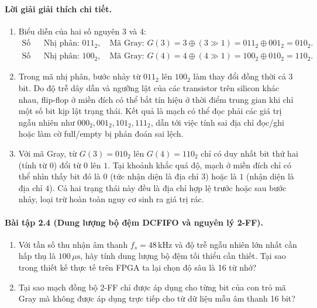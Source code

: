 \paragraph{Lời giải giải thích chi tiết.}
\begin{enumerate}[label=\alph*)]
    \item Biểu diễn của hai số nguyên 3 và 4:
    \begin{align*}
    \text{Số 3: } & \text{Nhị phân: } 011_2, \quad \text{Mã Gray: } G(3) = 3 \oplus (3 \gg 1) = 011_2 \oplus 001_2 = 010_2.\\
    \text{Số 4: } & \text{Nhị phân: } 100_2, \quad \text{Mã Gray: } G(4) = 4 \oplus (4 \gg 1) = 100_2 \oplus 010_2 = 110_2.
    \end{align*}
    \item Trong mã nhị phân, bước nhảy từ $011_2$ lên $100_2$ làm thay đổi đồng thời cả $3$ bit. Do độ trễ dây dẫn và ngưỡng lật của các transistor trên silicon khác nhau, flip-flop ở miền đích có thể bắt tín hiệu ở thời điểm trung gian khi chỉ một số bit kịp lật trạng thái. Kết quả là mạch có thể đọc phải các giá trị ngẫu nhiên như $000_2, 001_2, 101_2, 111_2$, dẫn tới việc tính sai địa chỉ đọc/ghi hoặc làm cờ full/empty bị phán đoán sai lệch.
    \item Với mã Gray, từ $G(3) = 010_2$ lên $G(4) = 110_2$ chỉ có duy nhất bit thứ hai (tính từ 0) đổi từ $0$ lên $1$. Tại khoảnh khắc quá độ, mạch ở miền đích chỉ có thể nhìn thấy bit đó là $0$ (tức nhận diện là địa chỉ $3$) hoặc là $1$ (nhận diện là địa chỉ $4$). Cả hai trạng thái này đều là địa chỉ hợp lệ trước hoặc sau bước nhảy, loại trừ hoàn toàn nguy cơ sinh ra giá trị rác.
\end{enumerate}

\paragraph{Bài tập 2.4 (Dung lượng bộ đệm DCFIFO và nguyên lý 2-FF).}
\begin{enumerate}[label=\alph*)]
    \item Với tần số thu nhận âm thanh $f_s = 48\,\text{kHz}$ và độ trễ ngẫu nhiên lớn nhất cần hấp thụ là $100\,\mu\mathrm{s}$, hãy tính dung lượng bộ đệm tối thiểu cần thiết. Tại sao trong thiết kế thực tế trên FPGA ta lại chọn độ sâu là 16 từ nhớ?
    \item Tại sao mạch đồng bộ 2-FF chỉ được áp dụng cho từng bit của con trỏ mã Gray mà không được áp dụng trực tiếp cho từ dữ liệu mẫu âm thanh 16 bit?
\end{enumerate}

